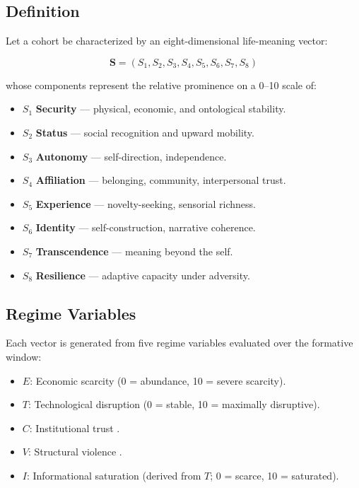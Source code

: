 \documentclass[conference]{IEEEtran}
\begin{document}
\subsection{Definition}

Let a cohort be characterized by an eight-dimensional life-meaning vector:

\begin{equation}
\mathbf{S} = (S_1, S_2, S_3, S_4, S_5, S_6, S_7, S_8)
\end{equation}

whose components represent the relative prominence on a 0--10 scale of:

\begin{itemize}
  \item $S_1$ \textbf{Security} --- physical, economic, and ontological stability.
  \item $S_2$ \textbf{Status} --- social recognition and upward mobility.
  \item $S_3$ \textbf{Autonomy} --- self-direction, independence.
  \item $S_4$ \textbf{Affiliation} --- belonging, community, interpersonal trust.
  \item $S_5$ \textbf{Experience} --- novelty-seeking, sensorial richness.
  \item $S_6$ \textbf{Identity} --- self-construction, narrative coherence.
  \item $S_7$ \textbf{Transcendence} --- meaning beyond the self.
  \item $S_8$ \textbf{Resilience} --- adaptive capacity under adversity.
\end{itemize}

\subsection{Regime Variables}

Each vector is generated from five regime variables evaluated over the formative window:

\begin{itemize}
  \item $E$: Economic scarcity (0 = abundance, 10 = severe scarcity).
  \item $T$: Technological disruption (0 = stable, 10 = maximally disruptive).
  \item $C$: Institutional trust \cite{pewresearch2023}.
  \item $V$: Structural violence \cite{fbi2024}.
  \item $I$: Informational saturation (derived from $T$; 0 = scarce, 10 = saturated).
\end{itemize}
\end{document}
